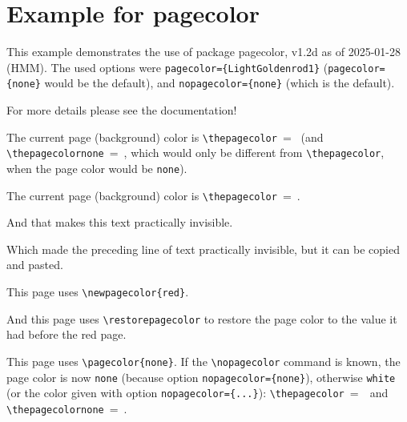 \documentclass[british]{article}[2024/06/29]%
\begin{document}
\section*{Example for pagecolor}

This example demonstrates the use of package\newline
\textsf{pagecolor}, v1.2d as of 2025-01-28 (HMM).\newline
The used options were\newline
\verb|pagecolor={LightGoldenrod1}|\newline
(\verb|pagecolor={none}| would be the default), and\newline
\verb|nopagecolor={none}| (which is the default).

\noindent For more details please see the documentation!

\noindent The current page (background) color is\newline
\verb|\thepagecolor|\ =\ \thepagecolor \newline
(and \verb|\thepagecolornone|\ =\ \thepagecolornone ,
which would only be different from \verb|\thepagecolor|,
when the page color would be \verb|none|).

\newpage
\pagecolor{rgb:-green!40!yellow,3;green!40!yellow,2;red,1}

{\color{white} The current page (background) color is\newline
\verb|\thepagecolor|\ =\ \thepagecolor .}

{\color{\thepagecolor} And that makes this text practically invisible.}

{\color{white} Which made the preceding line of text practically
invisible, but it can be copied and pasted.}

\newpage
{}

This page uses \verb|\newpagecolor{red}|.

\newpage
\restorepagecolor

{\color{white}And this page uses \verb|\restorepagecolor| to restore
the page color to the value it had before the red page.}

\newpage
\pagecolor{none}

This page uses \verb|\pagecolor{none}|. If the \verb|\nopagecolor|
command is known, the page color is now
\verb|none| (because option \verb|nopagecolor={none}|), otherwise
\verb|white| (or the color given with option \verb|nopagecolor={...}|):
\newline
\verb|\thepagecolor|\ =\ \thepagecolor\ and
\verb|\thepagecolornone|\ =\ \thepagecolornone .
\end{document}
